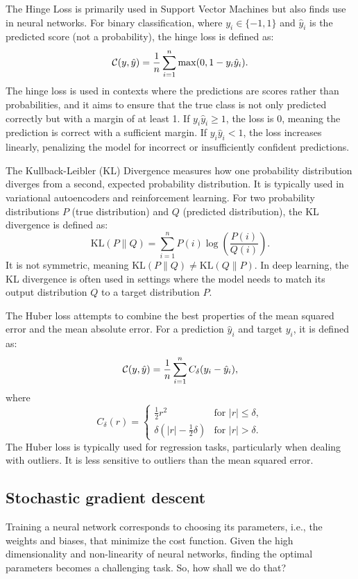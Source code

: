 The Hinge Loss is primarily used in Support Vector Machines  but  also finds use in  neural networks.
For binary classification, where $ y_i \in \{-1, 1\} $ and $ \hat{y}_i $ is the predicted score (not a probability), the hinge loss is defined as:
$$
{\mathcal C}(y,\hat{y}) = \frac{1}{n} \sum_{i=1}^{n} \max(0, 1 - y_i \hat{y}_i).
$$
The hinge loss is used in contexts where the predictions are scores rather than probabilities, and it aims to ensure that the true class is not only predicted correctly but with a margin of at least 1. If $ y_i \hat{y}_i \geq 1 $, the loss is 0, meaning the prediction is correct with a sufficient margin.
 If $ y_i \hat{y}_i < 1 $, the loss increases linearly, penalizing the model for incorrect or insufficiently confident predictions.


The Kullback-Leibler (KL) Divergence measures how one probability distribution diverges from a second, expected probability distribution. It is typically used in variational autoencoders and reinforcement learning.
For two probability distributions $ P $ (true distribution) and $ Q $ (predicted distribution), the KL divergence is defined as:
$$
\text{KL}(P \parallel Q) = \sum_{i=1}^{n} P(i) \log\left(\frac{P(i)}{Q(i)}\right).
$$
It is not symmetric, meaning $ \text{KL}(P \parallel Q) \neq \text{KL}(Q \parallel P) $.
In deep learning, the KL divergence is often used in settings where the model needs to match its output distribution $ Q $ to a target distribution $ P $.

The Huber loss attempts to combine the best properties of the mean squared error and the mean absolute error. For a prediction $ \hat{y}_i $ and target $ y_i $, it is defined as:
$$
{\mathcal C}(y,\hat{y}) = \frac{1}{n} \sum_{i=1}^{n} C_{\delta}(y_i - \hat{y}_i ),
$$
where
$$
C_{\delta}(r) = \begin{cases}
\frac{1}{2} r^2 & \text{for } |r| \leq \delta, \\
\delta (|r| - \frac{1}{2} \delta) & \text{for } |r| > \delta.
\end{cases}
$$
The Huber loss is typically used for regression tasks, particularly when dealing with outliers. It is less sensitive to outliers than the mean squared error.

\subsection{Stochastic gradient descent}\label{ss:SGDsubsection}

Training a neural network corresponds to choosing its parameters, i.e., the weights and biases, that
minimize the cost function. 
Given the high dimensionality and non-linearity of neural networks, finding the optimal parameters becomes a challenging task. So, how shall we do that?

